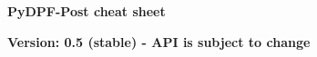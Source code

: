 \documentclass[9pt,landscape]{article}
\begin{document}
\raggedright
\footnotesize

\begin{center}
     \Huge{\textbf{PyDPF-Post cheat sheet}} \\
\end{center}

\begin{center}
  \small{\textbf{Version: 0.5 (stable) - API is subject to change}} \\
\end{center}

\vspace{-0.15cm}
\noindent\makebox[\linewidth]{\rule{\paperwidth}{2pt}}
\end{document}
